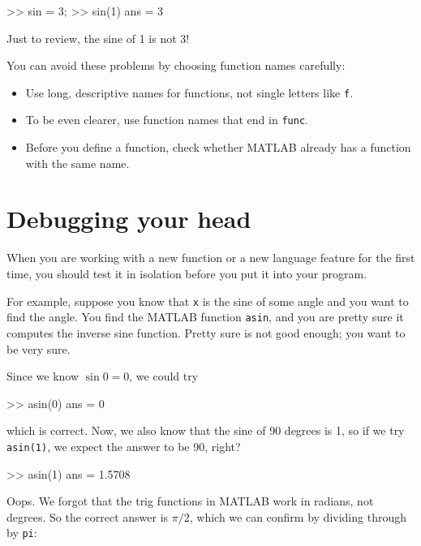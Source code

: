 \documentclass[
]{book}
\numberwithin{Answer}{chapter}
\numberwithin{Exercise}{chapter}
\begin{document}
\begin{code}
>> sin = 3;
>> sin(1)
ans = 3
\end{code}

Just to review, the sine of 1 is not 3!

You can avoid these problems by choosing function names carefully:

\begin{itemize}

\item Use long, descriptive names for functions, not single letters like {\tt f}.

\item To be even clearer, use function names that end in {\tt func}.

\item Before you define a function, check whether MATLAB already has a function with the same name.

\end{itemize}


\section{Debugging your head}

When you are working with a new function or a new language feature
for the first time, you should test it in isolation before you
put it into your program.


For example, suppose you know that {\tt x} is the sine of some
angle and you want to find the angle.  You find the MATLAB function
{\tt asin}, and you are pretty sure it computes the inverse sine
function.  Pretty sure is not good enough; you want to be very sure.

Since we know $\sin 0 = 0$, we could try

\begin{code}
>> asin(0)
ans = 0
\end{code}

which is correct.  Now, we also know that the sine of 90 degrees is
1, so if we try {\tt asin(1)}, we expect the answer to be 90, right?

\begin{code}
>> asin(1)
ans = 1.5708
\end{code}

Oops.  We forgot that the trig functions in MATLAB work in radians,
not degrees.  So the correct answer is $\pi/2$, which we can
confirm by dividing through by {\tt pi}:
\end{document}
